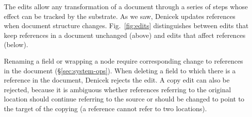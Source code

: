 \documentclass[sigconf,anonymous,screen]{acmart}
\begin{document}
The edits allow any transformation of a document through a series of steps whose effect can be
tracked by the substrate. As we saw, Denicek updates references when document structure changes.
Fig.~\ref{fig:edits} distinguishes between edits that keep references in a document unchanged
(above) and edits that affect references (below).

Renaming a field or wrapping a node require corresponding change to references in the document
(\S\ref{sec:system-ops}). When deleting a field to which there is a reference in the document, Denicek
rejects the edit. A copy edit can also be rejected, because it is ambiguous whether references
referring to the original location should continue referring to the source or should be changed to
point to the target of the copying (a reference cannot refer to two locations).

\end{document}
